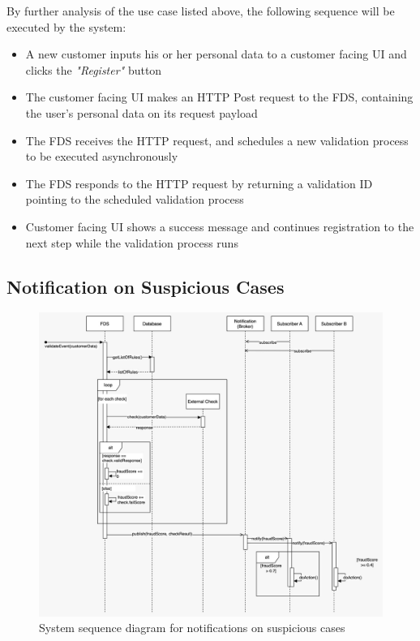 By further analysis of the use case listed above, the following sequence will be executed by the system:
\begin{itemize}
 \item A new customer inputs his or her personal data to a customer facing UI and clicks the \emph{"Register"} button
 \item The customer facing UI makes an HTTP Post request to the FDS, containing the user's personal data on its request payload
 \item The FDS receives the HTTP request, and schedules a new validation process to be executed asynchronously
 \item The FDS responds to the HTTP request by returning a validation ID pointing to the scheduled validation process
 \item Customer facing UI shows a success message and continues registration to the next step while the validation process runs 
\end{itemize}

\subsection{Notification on Suspicious Cases}
 \label{subsection:seq-notification}

\begin{figure}[!h]
 \includegraphics[width=\textwidth]{diagrams/sequence_notification.jpeg}
 \caption{System sequence diagram for notifications on suspicious cases}
\end{figure}

